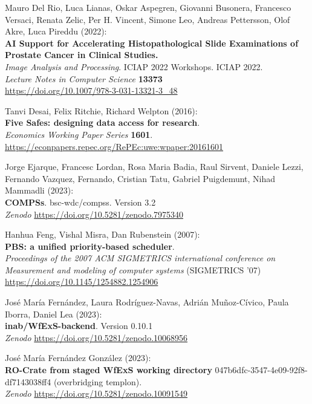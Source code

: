 \documentclass[10pt,letterpaper]{article}
\begin{document}
\begin{thebibliography}{10}
\begin{small}
Mauro Del Rio, Luca Lianas, Oskar Aspegren, Giovanni Busonera, Francesco Versaci, Renata Zelic, Per H. Vincent, Simone Leo, Andreas Pettersson, Olof Akre, Luca Pireddu (2022):\\
\textbf{AI Support for Accelerating Histopathological Slide Examinations of Prostate Cancer in Clinical Studies.}\\
\emph{Image Analysis and Processing}. ICIAP 2022 Workshops. ICIAP 2022. \\
\emph{Lecture Notes in Computer Science} \textbf{13373}\\
\url{https://doi.org/10.1007/978-3-031-13321-3_48}

Tanvi Desai, Felix Ritchie, Richard Welpton (2016):\\
\textbf{Five Safes: designing data access for research}.\\
\emph{Economics Working Paper Series} \textbf{1601}.\\
\url{https://econpapers.repec.org/RePEc:uwe:wpaper:20161601}

Jorge Ejarque, Francesc Lordan, Rosa Maria Badia, Raul Sirvent, Daniele Lezzi, Fernando Vazquez, Fernando, Cristian Tatu,  Gabriel Puigdemunt, Nihad Mammadli (2023):\\
\textbf{COMPSs}. bsc-wdc/compss. Version 3.2\\
\emph{Zenodo}
\url{https://doi.org/10.5281/zenodo.7975340}

Hanhua Feng, Vishal Misra, Dan Rubenstein (2007):\\
\textbf{PBS: a unified priority-based scheduler}.\\
\emph{Proceedings of the 2007 ACM SIGMETRICS international conference on Measurement and modeling of computer systems} (SIGMETRICS '07)\\
\url{https://doi.org/10.1145/1254882.1254906} 

José María Fernández, Laura Rodríguez-Navas, Adrián Muñoz-Cívico, Paula Iborra, Daniel Lea (2023):\\
\textbf{inab/WfExS-backend}. Version 0.10.1\\
\emph{Zenodo}
\url{https://doi.org/10.5281/zenodo.10068956}

José María Fernández González (2023):\\
\textbf{RO-Crate from staged WfExS working directory} 047b6dfc-3547-4e09-92f8-df7143038ff4 (overbridging templon).\\
\emph{Zenodo}
\url{https://doi.org/10.5281/zenodo.10091549}


\end{small}
\end{thebibliography}
\end{document}

